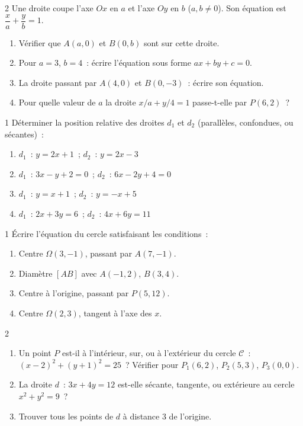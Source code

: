 \begin{exo}{2}
Une droite coupe l'axe $Ox$ en $a$ et l'axe $Oy$ en $b$ ($a,b\ne0$).
Son \'equation est $\dfrac{x}{a}+\dfrac{y}{b}=1$.
\begin{enumerate}
  \item V\'erifier que $A(a,0)$ et $B(0,b)$ sont sur cette droite.
  \item Pour $a=3$, $b=4$~: \'ecrire l'\'equation sous forme $ax+by+c=0$.
  \item La droite passant par $A(4,0)$ et $B(0,-3)$~: \'ecrire son \'equation.
  \item Pour quelle valeur de $a$ la droite $x/a+y/4=1$ passe-t-elle par $P(6,2)$~?
\end{enumerate}
\end{exo}

\begin{exo}{1}
D\'eterminer la position relative des droites $d_1$ et $d_2$
(parall\`eles, confondues, ou s\'ecantes)~:
\begin{enumerate}
  \item $d_1$~: $y=2x+1$~; $d_2$~: $y=2x-3$
  \item $d_1$~: $3x-y+2=0$~; $d_2$~: $6x-2y+4=0$
  \item $d_1$~: $y=x+1$~; $d_2$~: $y=-x+5$
  \item $d_1$~: $2x+3y=6$~; $d_2$~: $4x+6y=11$
\end{enumerate}
\end{exo}

\begin{exo}{1}
\'Ecrire l'\'equation du cercle satisfaisant les conditions~:
\begin{enumerate}
  \item Centre $\Omega(3,-1)$, passant par $A(7,-1)$.
  \item Diam\`etre $[AB]$ avec $A(-1,2)$, $B(3,4)$.
  \item Centre \`a l'origine, passant par $P(5,12)$.
  \item Centre $\Omega(2,3)$, tangent \`a l'axe des $x$.
\end{enumerate}
\end{exo}

\begin{exo}{2}
\begin{enumerate}
  \item Un point $P$ est-il \`a l'int\'erieur, sur, ou \`a l'ext\'erieur
        du cercle $\mathcal{C}$~: $(x-2)^2+(y+1)^2=25$~?
        V\'erifier pour $P_1(6,2)$, $P_2(5,3)$, $P_3(0,0)$.
  \item La droite $d$~: $3x+4y=12$ est-elle s\'ecante, tangente,
        ou ext\'erieure au cercle $x^2+y^2=9$~?
  \item Trouver tous les points de $d$ \`a distance $3$ de l'origine.
\end{enumerate}
\end{exo}

